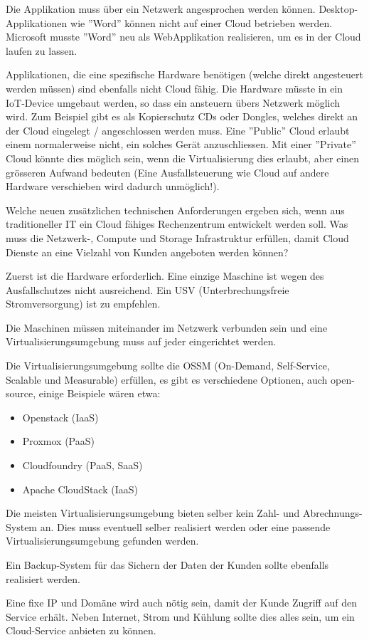 \documentclass[11pt,titlepage]{article}
\newenvironment{shadedquotation}
 {\begin{shaded*}
  \quoting[leftmargin=0pt, vskip=0pt]
 }
 {\endquoting
 \end{shaded*}
}
\begin{document}
Die Applikation muss über ein Netzwerk angesprochen werden können. Desktop-Applikationen wie ''Word'' können nicht auf einer Cloud betrieben werden.
Microsoft musste ''Word'' neu als WebApplikation realisieren, um es in der Cloud laufen zu lassen.
\par\medskip
Applikationen, die eine spezifische Hardware benötigen (welche direkt angesteuert werden müssen) sind ebenfalls nicht Cloud fähig. Die Hardware müsste in ein IoT-Device umgebaut werden, so dass ein ansteuern übers Netzwerk möglich wird.
Zum Beispiel gibt es als Kopierschutz CDs oder Dongles, welches direkt an der Cloud eingelegt / angeschlossen werden muss. Eine ''Public'' Cloud erlaubt einem normalerweise nicht, ein solches Gerät anzuschliessen.
Mit einer ''Private'' Cloud könnte dies möglich sein, wenn die Virtualisierung dies erlaubt, aber einen grösseren Aufwand bedeuten (Eine Ausfallsteuerung wie Cloud auf andere Hardware verschieben wird dadurch unmöglich!).

\label{sec:Aufgabe-4_technic}
\begin{shadedquotation}
  Welche neuen zusätzlichen technischen Anforderungen ergeben sich, wenn aus traditioneller IT
    ein Cloud fähiges Rechenzentrum entwickelt werden soll. Was muss die Netzwerk-, Compute
    und Storage Infrastruktur erfüllen, damit Cloud Dienste an eine Vielzahl von Kunden angeboten
    werden können?
\end{shadedquotation}

Zuerst ist die Hardware erforderlich. Eine einzige Maschine ist wegen des Ausfallschutzes nicht ausreichend. Ein USV (Unterbrechungsfreie Stromversorgung) ist zu empfehlen.
\par\medskip
Die Maschinen müssen miteinander im Netzwerk verbunden sein und eine Virtualisierungsumgebung muss auf jeder eingerichtet werden.
\par\medskip
Die Virtualisierungsumgebung sollte die OSSM (On-Demand, Self-Service, Scalable und Measurable) erfüllen, es gibt es verschiedene Optionen, auch open-source, einige Beispiele wären etwa:
\begin{itemize}
  \item Openstack (IaaS)
  \item Proxmox (PaaS)
  \item Cloudfoundry (PaaS, SaaS)
  \item Apache CloudStack (IaaS)
\end{itemize}
Die meisten Virtualisierungsumgebung bieten selber kein Zahl- und Abrechnungs-System an. Dies muss eventuell selber realisiert werden oder eine passende Virtualisierungsumgebung gefunden werden.
\par\medskip
Ein Backup-System für das Sichern der Daten der Kunden sollte ebenfalls realisiert werden.
\par\medskip
Eine fixe IP und Domäne wird auch nötig sein, damit der Kunde Zugriff auf den Service erhält.
Neben Internet, Strom und Kühlung sollte dies alles sein, um ein Cloud-Service anbieten zu können.
\end{document}
